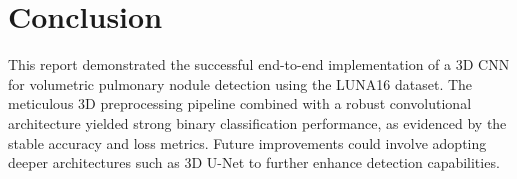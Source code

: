 \documentclass[10pt, twocolumn, a4paper]{article}
\begin{document}
\section{Conclusion}
This report demonstrated the successful end-to-end implementation of a 3D CNN for volumetric pulmonary nodule detection using the LUNA16 dataset. The meticulous 3D preprocessing pipeline combined with a robust convolutional architecture yielded strong binary classification performance, as evidenced by the stable accuracy and loss metrics. Future improvements could involve adopting deeper architectures such as 3D U-Net to further enhance detection capabilities.
\end{document}
